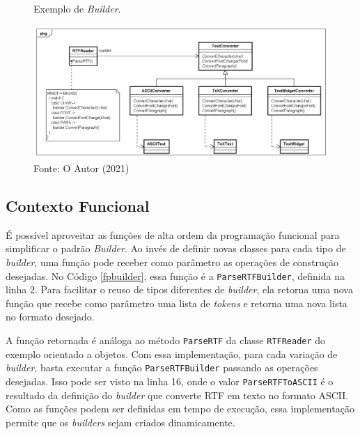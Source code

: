 \begin{figure}[htb]
	\caption{\label{builder_exemplo}Exemplo de \textit{Builder}.}
	\begin{center}
	    \includegraphics[scale=0.5]{5_padroes-contexto-funcional/5.1_criacionais/5.1.3_builder/builder_exemplo.png}
	\end{center}
  \caption*{Fonte: O Autor (2021)}
\end{figure}

\subsection*{Contexto Funcional}

É possível aproveitar as funções de alta ordem 
da programação funcional para simplificar o 
padrão \textit{Builder}. Ao invés de definir novas 
classes para cada tipo de \textit{builder}, uma função 
pode receber como 
parâmetro as operações de construção desejadas. 
No Código \ref{fpbuilder}, essa função é a 
\texttt{ParseRTFBuilder}, definida na linha 2. 
Para facilitar o reuso de tipos diferentes 
de \textit{builder}, ela retorna uma nova 
função que recebe como parâmetro uma 
lista de \textit{tokens} e 
retorna uma nova lista no formato desejado. 

A função retornada é análoga ao método 
\texttt{ParseRTF} da classe \texttt{RTFReader} do exemplo 
orientado a objetos. Com essa implementação, 
para cada variação de \textit{builder}, 
basta executar a função 
\texttt{ParseRTFBuilder} passando as operações 
desejadas. Isso pode ser visto na linha 16, 
onde o valor \texttt{ParseRTFToASCII} é o resultado 
da definição do \textit{builder} que converte 
RTF em texto no formato ASCII. Como as funções 
podem ser definidas em tempo de execução, essa 
implementação permite que os \textit{builders} 
sejam criados dinamicamente.

